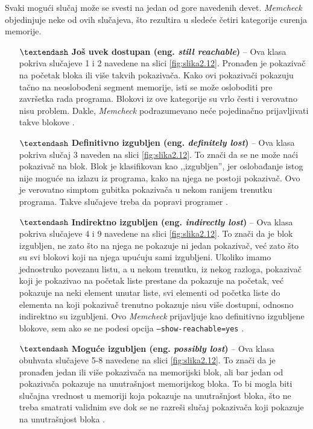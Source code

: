 \documentclass[12pt,oneside]{memoir}
\theoremstyle{plain}
\theoremstyle{definition}
\begin{document}
Svaki mogući slučaj može se svesti na jedan od gore navedenih devet. \textit{Memcheck} objedinjuje neke od ovih slučajeva, što rezultira u sledeće četiri kategorije curenja memorije.
\begin{itemize}
\item[$\textendash$] \textbf{Još uvek dostupan (eng. \textit{still reachable})} – Ova klasa pokriva slučajeve 1 i 2 navedene na slici \ref{fig:slika2.12}. Pronađen je pokazivač na početak bloka ili više takvih pokazivača. Kako ovi pokazivači pokazuju tačno na neoslobođeni segment memorije, isti se može osloboditi pre završetka rada programa. Blokovi iz ove kategorije su vrlo česti i verovatno nisu problem. Dakle, \textit{Memcheck} podrazumevano neće pojedinačno prijavljivati takve blokove \cite{ValgrindDOC}.
\item[$\textendash$] \textbf{Definitivno izgubljen (eng. \textit{definitely lost})} – Ova klasa pokriva slučaj 3 naveden na slici \ref{fig:slika2.12}. To znači da se ne može naći pokazivač na blok. Blok je klasifikovan kao ,,izgubljen'', jer oslobađanje istog nije moguće na izlazu iz programa, kako na njega ne postoji pokazivač. Ovo je verovatno simptom gubitka pokazivača u nekom ranijem trenutku programa. Takve slučajeve treba da popravi programer \cite{ValgrindDOC}.
\item[$\textendash$] \textbf{Indirektno izgubljen (eng. \textit{indirectly lost})} – Ova klasa pokriva slučajeve 4 i 9 navedene na slici \ref{fig:slika2.12}. To znači da je blok izgubljen, ne zato što na njega ne pokazuje ni jedan pokazivač, već zato što su svi blokovi koji na njega upućuju sami izgubljeni. Ukoliko imamo jednostruko povezanu listu, a u nekom trenutku, iz nekog razloga, pokazivač koji je pokazivao na početak liste prestane da pokazuje na početak, već pokazuje na neki element unutar liste, svi elementi od početka liste do elementa na koji pokazivač trenutno pokazuje nisu više dostupni, odnosno indirektno su izgubljeni. Ovo \textit{Memcheck} prijavljuje kao definitivno izgubljene blokove, sem ako se ne podesi opcija \texttt{–show-reachable=yes} \cite{ValgrindDOC}.
\item[$\textendash$] \textbf{Moguće izgubljen (eng. \textit{possibly lost})} – Ova klasa obuhvata slučajeve 5-8 navedene na slici \ref{fig:slika2.12}. To znači da je pronađen jedan ili više pokazivača na memorijski blok, ali bar jedan od pokazivača pokazuje na unutrašnjost memorijskog bloka. To bi mogla biti  slučajna vrednost u memoriji koja pokazuje na unutrašnjost bloka, što ne treba smatrati validnim sve dok se ne razreši slučaj pokazivača koji pokazuje na unutrašnjost bloka \cite{ValgrindDOC}.
\end{itemize}
\end{document}
